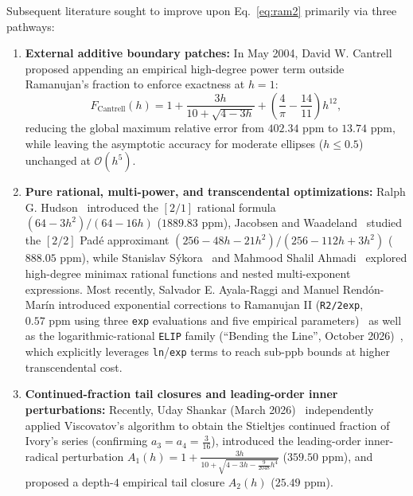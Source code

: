 \documentclass[11pt,a4paper]{article}
\theoremstyle{spacious}
\theoremstyle{spaciousdef}
\begin{document}
Subsequent literature sought to improve upon Eq.~\eqref{eq:ram2} primarily via three pathways:
\begin{enumerate}
    \item \textbf{External additive boundary patches:} In May 2004, David W. Cantrell~\cite{Cantrell2004,MichonNumericana} proposed appending an empirical high-degree power term outside Ramanujan's fraction to enforce exactness at $h = 1$:
    \begin{equation}\label{eq:cantrell}
    F_{\text{Cantrell}}(h) = 1 + \frac{3h}{10 + \sqrt{4 - 3h}} + \left(\frac{4}{\pi} - \frac{14}{11}\right)h^{12},
    \end{equation}
    reducing the global maximum relative error from $402.34\text{ ppm}$ to $13.74\text{ ppm}$, while leaving the asymptotic accuracy for moderate ellipses ($h \le 0.5$) unchanged at $\mathcal{O}(h^5)$.
    \item \textbf{Pure rational, multi-power, and transcendental optimizations:} Ralph G. Hudson~\cite{Hudson1917} introduced the $[2/1]$ rational formula $(64 - 3h^2)/(64 - 16h)$ ($1889.83\text{ ppm}$), Jacobsen and Waadeland~\cite{JacobsenWaadeland1985} studied the $[2/2]$ Pad\'e approximant $(256 - 48h - 21h^2)/(256 - 112h + 3h^2)$ ($888.05\text{ ppm}$), while Stanislav S\'ykora~\cite{Sykora2005,Sykora2007} and Mahmood Shalil Ahmadi~\cite{Sykora2007} explored high-degree minimax rational functions and nested multi-exponent expressions. Most recently, Salvador E. Ayala-Raggi and Manuel Rend\'on-Mar\'in introduced exponential corrections to Ramanujan II (\texttt{R2/2exp}, $0.57\text{ ppm}$ using three \texttt{exp} evaluations and five empirical parameters)~\cite{AyalaRaggi2025} as well as the logarithmic-rational \texttt{ELIP} family (``Bending the Line'', October 2026)~\cite{AyalaRaggi2026ELIP}, which explicitly leverages \texttt{ln}/\texttt{exp} terms to reach sub-ppb bounds at higher transcendental cost.
    \item \textbf{Continued-fraction tail closures and leading-order inner perturbations:} Recently, Uday Shankar (March 2026)~\cite{Shankar2026} independently applied Viscovatov's algorithm to obtain the Stieltjes continued fraction of Ivory's series (confirming $a_3 = a_4 = \tfrac{3}{16}$), introduced the leading-order inner-radical perturbation $A_1(h) = 1 + \tfrac{3h}{10+\sqrt{4-3h-\frac{9}{2048}h^4}}$ ($359.50\text{ ppm}$), and proposed a depth-$4$ empirical tail closure $A_2(h)$ ($25.49\text{ ppm}$).
\end{enumerate}
\end{document}
